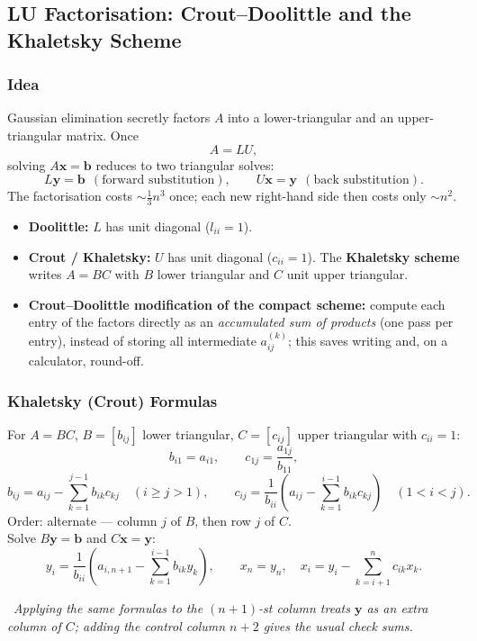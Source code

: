 \documentclass[hidelinks]{article}
\newcommand{\callout}[1]{\par\smallskip\noindent{\color{capri}$\blacktriangleright$}\ \textit{#1}\par\smallskip}
\begin{document}
\subsection{LU Factorisation: Crout--Doolittle and the Khaletsky Scheme}\label{sec:lu}

\subsubsection{Idea}

Gaussian elimination secretly factors $A$ into a lower-triangular and an upper-triangular matrix. Once
\[
A=LU,
\]
solving $A\mathbf x=\mathbf b$ reduces to two triangular solves:
\[
L\mathbf y=\mathbf b\ \ (\text{forward substitution}),\qquad U\mathbf x=\mathbf y\ \ (\text{back substitution}).
\]
The factorisation costs $\sim\frac13n^3$ once; each new right-hand side then costs only $\sim n^2$.

\begin{itemize}
    \item \textbf{Doolittle:} $L$ has unit diagonal ($l_{ii}=1$).
    \item \textbf{Crout / Khaletsky:} $U$ has unit diagonal ($c_{ii}=1$). The \textbf{Khaletsky scheme} writes $A=BC$ with $B$ lower triangular and $C$ unit upper triangular.
    \item \textbf{Crout--Doolittle modification of the compact scheme:} compute each entry of the factors directly as an \emph{accumulated sum of products} (one pass per entry), instead of storing all intermediate $a^{(k)}_{ij}$; this saves writing and, on a calculator, round-off.
\end{itemize}

\subsubsection{Khaletsky (Crout) Formulas}

For $A=BC$, $B=[b_{ij}]$ lower triangular, $C=[c_{ij}]$ upper triangular with $c_{ii}=1$:
\[
b_{i1}=a_{i1},\qquad c_{1j}=\frac{a_{1j}}{b_{11}},
\]
\[
b_{ij}=a_{ij}-\sum_{k=1}^{j-1}b_{ik}c_{kj}\quad(i\ge j>1),\qquad
c_{ij}=\frac{1}{b_{ii}}\left(a_{ij}-\sum_{k=1}^{i-1}b_{ik}c_{kj}\right)\quad(1<i<j).
\]
Order: alternate --- column $j$ of $B$, then row $j$ of $C$.\\
Solve $B\mathbf y=\mathbf b$ and $C\mathbf x=\mathbf y$:
\[
y_i=\frac{1}{b_{ii}}\left(a_{i,n+1}-\sum_{k=1}^{i-1}b_{ik}y_k\right),\qquad
x_n=y_n,\quad x_i=y_i-\sum_{k=i+1}^nc_{ik}x_k .
\]
\callout{Applying the same formulas to the $(n+1)$-st column treats $\mathbf y$ as an extra column of $C$; adding the control column $n+2$ gives the usual check sums.}
\end{document}
